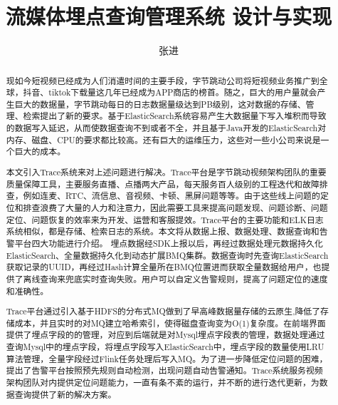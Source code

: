 \documentclass[winfonts,master,twoside]{njuthesis}
\title{流媒体埋点查询管理系统
设计与实现
}
\author{张进}
\institute{南京大学}
\begin{document}

\maketitle
\makeenglishtitle


\frontmatter

\begin{abstract}
 现如今短视频已经成为人们消遣时间的主要手段，字节跳动公司将短视频业务推广到全球，抖音、tiktok下载量这几年已经成为APP商店的榜首。随之，巨大的用户量就会产生巨大的数据量，字节跳动每日的日志数据量级达到PB级别，这对数据的存储、管理、检索提出了新的要求。基于ElasticSearch系统容易产生大数据量下写入堆积而导致的数据写入延迟，从而使数据查询不到或者不全，并且基于Java开发的ElasticSearch对内存、磁盘、CPU的要求都比较高。还有巨大的运维压力，这些对一些小公司来说是一个巨大的成本。
 
本文引入Trace系统来对上述问题进行解决。Trace平台是字节跳动视频架构团队的重要质量保障工具，主要服务直播、点播两大产品，每天服务百人级别的工程迭代和故障排查，例如连麦、RTC、流信息、音视频、卡顿、黑屏问题等等。由于这些线上问题的定位和排查浪费了大量的人力和注意力，因此需要工具来提高问题发现、问题诊断、问题定位、问题恢复的效率来为开发、运营和客服提效。Trace平台的主要功能和ELK日志系统相似，都是存储、检索日志的系统。本文将从数据上报、数据处理、数据查询和告警平台四大功能进行介绍。
埋点数据经SDK上报以后，再经过数据处理元数据持久化ElasticSearch、全量数据持久化到动态扩展BMQ集群。数据查询时先查询ElasticSearch获取记录的UUID，再经过Hash计算全量所在BMQ位置进而获取全量数据给用户，也提供了离线查询来兜底实时查询失败。用户可以自定义告警规则，提高了问题定位的速度和准确性。

Trace平台通过引入基于HDFS的分布式MQ做到了早高峰数据量存储的云原生,降低了存储成本，并且实时的对MQ建立哈希索引，使得磁盘查询变为O(1)复杂度。在前端界面提供了埋点字段的的管理，对应到后端就是对Mysql埋点字段表的管理，数据处理通过查询Mysql中的埋点字段，将埋点字段写入ElasticSearch中，埋点字段的数量使用LRU算法管理，全量字段经过Flink任务处理后写入MQ。为了进一步降低定位问题的困难，提出了告警平台按照预先规则自动检测，出现问题自动告警通知。Trace系统服务视频架构团队对内提供定位问题能力，一直有条不紊的运行，并不断的进行迭代更新，为数据查询提供了新的解决方案。

\end{abstract}
\end{document}
